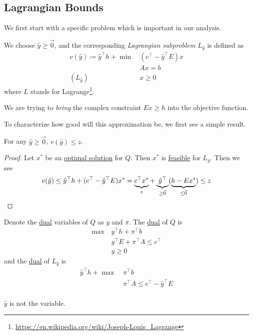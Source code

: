 \subsection{Lagrangian Bounds}
We first start with a specific problem which is important in our analysis.
\begin{definition}\label{def:Lagrangian-subproblem}
	We choose \(\hat{y}\geq \vec{0}\), and the corresponding \emph{Lagrangian subproblem} \(L_{\hat{y}}\) is defined as
	\begin{align*}
		v(\hat{y})\coloneqq \hat{y}^{\top}h + \min~ & (c^{\top} - \hat{y}^{\top}E)x \\
		                                            & Ax = b                        \\
		(L_{\hat{y}})\quad                          & x\geq 0
	\end{align*}
	where \(L\) stands for Lagrange\footnote{\url{https://en.wikipedia.org/wiki/Joseph-Louis_Lagrange}}.
\end{definition}

\begin{intuition}
	We are trying to \emph{bring} the complex constraint \(Ex\geq h\) into the objective function.
\end{intuition}

To characterize how good will this approximation be, we first see a simple result.
\begin{lemma}\label{lma:lec18-1}
	For any \(\hat{y}\geq \vec{0}\), \(v(\hat{y})\leq z\).
\end{lemma}
\begin{proof}
	Let \(x^{\ast}\) be an \hyperref[def:optimal-solution]{optimal solution} for \(Q\). Then \(x^{\ast}\) is \hyperref[def:feasible-solution]{feasible} for \(L_{\hat{y}}\).
	Then we see
	\[
		v(\hat{y}) \leq \hat{y}^{\top}h + (c^{\top} - \hat{y}^{\top} E )x^{\ast} = \underbrace{\vphantom{\hat{y}^{\top}}c^{\top}x^{\ast}}_{z} + \underbrace{\hat{y}^{\top}}_{\geq \vec{0}}(\underbrace{\vphantom{\hat{y}^{\top}}h - Ex^{\ast}}_{\leq \vec{0}}) \leq z
	\]
\end{proof}

Denote the \hyperref[def:dual]{dual} variables of \(Q\) as \(y\) and \(\pi\). The \hyperref[def:dual]{dual} of \(Q\) is
\begin{align*}
	\max~ & y^{\top}h + \pi^{\top} b             \\
	      & y^{\top}E + \pi^{\top}A\leq c^{\top} \\
	      & y\geq 0
\end{align*}
and the \hyperref[def:dual]{dual} of \(L_{\hat{y}}\) is
\begin{align*}
	\hat{y}^{\top}h + \max~ & \pi^{\top}b                                \\
	                        & \pi^{\top}A\leq c^{\top} - \hat{y}^{\top}E \\
\end{align*}
\begin{note}
	\(\hat{y}\) is not the variable.
\end{note}

